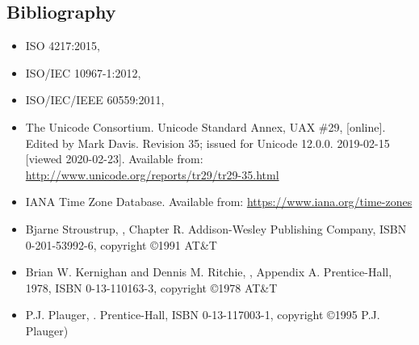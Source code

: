 \documentclass{wg21}
\begin{document}
\subsection{Bibliography}

\begin{itemize}
    \renewcommand{\labelitemi}{---}
    \item
    ISO 4217:2015,
    \item
    ISO/IEC 10967-1:2012,
    \item
    ISO/IEC/IEEE 60559:2011, 
    \item
    The Unicode Consortium. Unicode Standard Annex, UAX \#29,
     [online].
    Edited by Mark Davis. Revision 35; issued for Unicode 12.0.0. 2019-02-15 [viewed 2020-02-23].
    Available from: \url{http://www.unicode.org/reports/tr29/tr29-35.html}
    \item
    IANA Time Zone Database.
    Available from: \url{https://www.iana.org/time-zones}
    \item
    Bjarne Stroustrup,
    , Chapter R.
    Addison-Wesley Publishing Company, ISBN 0-201-53992-6, copyright \copyright 1991 AT\&T
    \item
    Brian W. Kernighan and Dennis M. Ritchie,
    , Appendix A.
    Prentice-Hall, 1978, ISBN 0-13-110163-3, copyright \copyright 1978 AT\&T
    \item
    P.J. Plauger,
    .
    Prentice-Hall, ISBN 0-13-117003-1, copyright \copyright 1995 P.J. Plauger)
\end{itemize}
\end{document}

